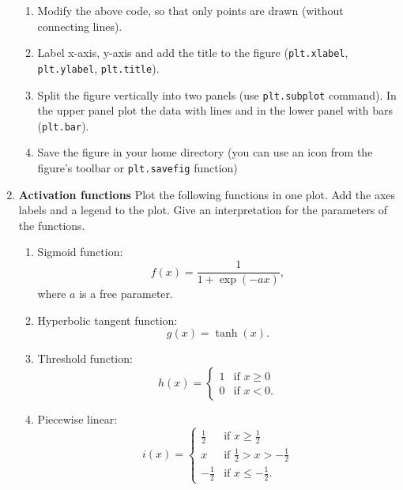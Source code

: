 \documentclass[12pt, a4]{article}
\begin{document}
\begin{enumerate}
    \begin{enumerate}
        \item Modify the above code, so that only points are drawn (without connecting lines).
        \item Label x-axis, y-axis and add the title to the figure (\texttt{plt.xlabel}, \texttt{plt.ylabel}, \texttt{plt.title}).
        \item Split the figure vertically into two panels (use \texttt{plt.subplot} command). In the upper panel plot the data with lines and in the lower panel with bars (\texttt{plt.bar}).
        \item Save the figure in your home directory (you can use an icon from the figure's toolbar or \texttt{plt.savefig} function)
    \end{enumerate}

    \item \textbf{Activation functions}
    \label{ex:activation}
        Plot the following functions in one plot. Add the axes labels and a legend to the plot. Give an interpretation for the parameters of the functions.
    
        \begin{enumerate}
            \item Sigmoid function:
                $$f(x)=\frac{1}{1+\exp(-ax)},$$ 
                where $a$ is a free parameter.
            \item Hyperbolic tangent function:
                $$g(x)=\tanh(x).$$
            \item Threshold function:
                \begin{equation*}
                    h(x)=\begin{cases}1 & \text{if $x\geq0$} \\
                                    0 & \text{if $x<0$.}
                        \end{cases}
                \end{equation*}
            \item Piecewise linear:
                \begin{equation*}
                    i(x)=\begin{cases} \frac{1}{2}& \text{if $x\geq\frac{1}{2}$} \\
                        x & \text{if $\frac{1}{2}>x>-\frac{1}{2}$} \\
                        -\frac{1}{2} & \text{if $x\leq-\frac{1}{2}$.}
                        \end{cases}
                \end{equation*}
    

\end{enumerate}
\end{enumerate}
\end{document}
